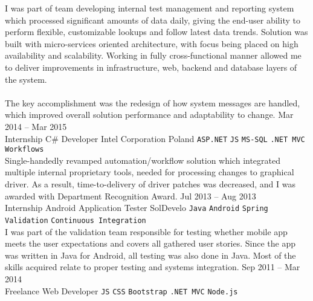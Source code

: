 \documentclass[9pt]{style/developercv}
\begin{document}
\begin{entrylist}
{			I was part of team developing internal test management and reporting 
			system which processed significant amounts of data daily, giving 
			the end-user ability to perform flexible, customizable lookups
			and follow latest data trends.
			Solution was built with micro-services oriented architecture, with 
			focus being placed on high availability and scalability.
			Working in fully cross-functional manner allowed me to deliver 
			improvements in infrastructure, web, backend and database layers 
			of the system.\\ \\
			The key accomplishment was the redesign of how system messages are 
			handled, which improved overall solution performance and adaptability to
			change.
		}
	\entry
		{Mar 2014 -- Mar 2015\\\footnotesize{Internship}}
		{C\# Developer}
		{Intel Corporation Poland}
		{
			\texttt{ASP.NET}\slashsep
			\texttt{JS}\slashsep
			\texttt{MS-SQL}\slashsep
			\texttt{.NET MVC}\slashsep
			\texttt{Workflows}\\

			Single-handedly revamped automation/workflow solution which integrated
			multiple internal proprietary tools, needed for processing changes to 
			graphical driver. As a result, time-to-delivery of driver patches was 
			decreased, and I was awarded with Department Recognition Award.
		}
	\entry
		{Jul 2013 -- Aug 2013\\\footnotesize{Internship}}
		{Android Application Tester}
		{SolDevelo}
		{
			\texttt{Java}\slashsep
			\texttt{Android}\slashsep
			\texttt{Spring}\slashsep
			\texttt{Validation}\slashsep
			\texttt{Continuous Integration}\\

			I was part of the validation team responsible for testing whether 
			mobile app meets the user expectations and covers all gathered user 
			stories. Since the app was written in  Java for Android, all testing 
			was also done in Java. Most of the skills acquired relate to proper 
			testing and systems integration.
		}
	\entry
		{Sep 2011 -- Mar 2014\\\footnotesize{Freelance}}
		{Web Developer}
		{}
		{
			\texttt{JS}\slashsep
			\texttt{CSS}\slashsep
			\texttt{Bootstrap}\slashsep
			\texttt{.NET MVC}\slashsep
			\texttt{Node.js}\\
		}
\end{entrylist}

\end{document}
